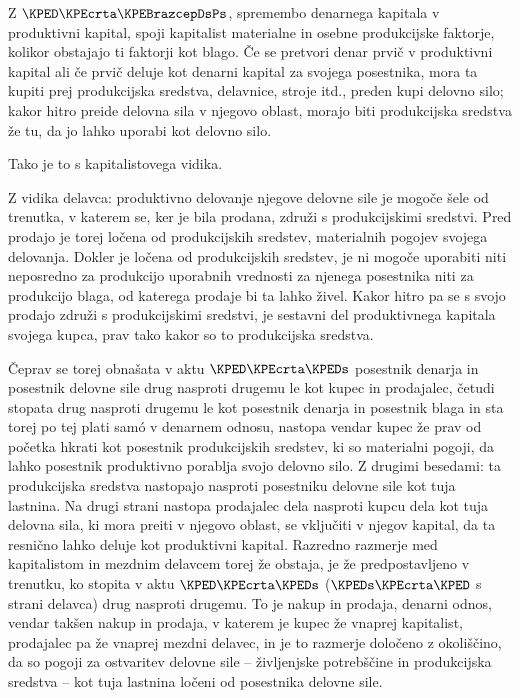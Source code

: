 \documentclass[kapital_02.tex]{subfiles}
\begin{document}
Z \(\KPED\KPEcrta\KPEBrazcepDsPs\), spremembo denarnega kapitala v produktivni kapital, spoji kapitalist materialne in osebne produkcijske faktorje, kolikor obstajajo ti faktorji kot blago. Če se pretvori denar prvič v produktivni kapital ali če prvič deluje kot denarni kapital za svojega posestnika, mora ta kupiti prej produkcijska sredstva, delavnice, stroje itd., preden kupi delovno silo; kakor hitro preide delovna sila v njegovo oblast, morajo biti produkcijska sredstva že tu, da jo lahko uporabi kot delovno silo.

Tako je to s kapitalistovega vidika.

Z \KPEstran vidika delavca: produktivno delovanje njegove delovne sile je mogoče šele od trenutka, v katerem se, ker je bila prodana, združi s produkcijskimi sredstvi. Pred prodajo je torej ločena od produkcijskih sredstev, materialnih pogojev svojega delovanja. Dokler je ločena od produkcijskih sredstev, je ni mogoče uporabiti niti neposredno za produkcijo uporabnih vrednosti za njenega posestnika niti za produkcijo blaga, od katerega prodaje bi ta lahko živel. Kakor hitro pa se s svojo prodajo združi s produkcijskimi sredstvi, je sestavni del produktivnega kapitala svojega kupca, prav tako kakor so to produkcijska sredstva.

Čeprav se torej obnašata v aktu \(\KPED\KPEcrta\KPEDs\) posestnik denarja in posestnik delovne sile drug nasproti drugemu le kot kupec in prodajalec, četudi stopata drug nasproti drugemu le kot posestnik denarja in posestnik blaga in sta torej po tej plati sam\'o v denarnem odnosu, nastopa vendar kupec že prav od početka hkrati kot posestnik produkcijskih sredstev, ki so materialni pogoji, da lahko posestnik produktivno porablja svojo delovno silo. Z drugimi besedami: ta produkcijska sredstva nastopajo nasproti posestniku delovne sile kot tuja lastnina. Na drugi strani nastopa prodajalec dela nasproti kupcu dela kot tuja delovna sila, ki mora preiti v njegovo oblast, se vključiti v njegov kapital, da ta resnično lahko deluje kot produktivni kapital. Razredno razmerje med kapitalistom in mezdnim delavcem torej že obstaja, je že predpostavljeno v trenutku, ko stopita v aktu \(\KPED\KPEcrta\KPEDs\) (\(\KPEDs\KPEcrta\KPED\) s strani delavca) drug nasproti drugemu. To je nakup in prodaja, denarni odnos, vendar takšen nakup in prodaja, v katerem je kupec že vnaprej kapitalist, prodajalec pa že vnaprej mezdni delavec, in je to razmerje določeno z okoliščino, da so pogoji za ostvaritev delovne sile -- življenjske potrebščine in produkcijska sredstva -- kot tuja lastnina ločeni od posestnika delovne sile.
\end{document}
